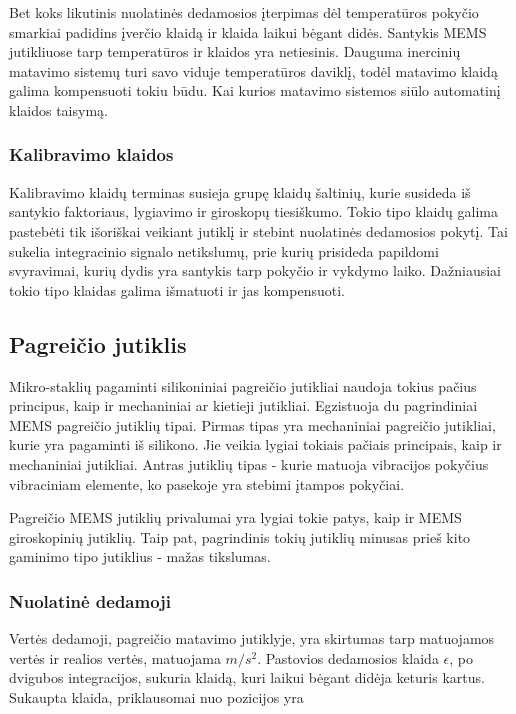 Bet koks likutinis nuolatinės dedamosios įterpimas dėl temperatūros pokyčio smarkiai padidins įverčio klaidą ir klaida laikui bėgant didės.
Santykis MEMS jutikliuose tarp temperatūros ir klaidos yra netiesinis.
Dauguma inercinių matavimo sistemų turi savo viduje temperatūros daviklį, todėl matavimo klaidą galima kompensuoti tokiu būdu. 
Kai kurios matavimo sistemos siūlo automatinį klaidos taisymą.

\subsubsection{Kalibravimo klaidos}

Kalibravimo klaidų terminas susieja grupę klaidų šaltinių, kurie susideda iš santykio faktoriaus, lygiavimo ir giroskopų tiesiškumo. 
Tokio tipo klaidų galima pastebėti tik išoriškai veikiant jutiklį ir stebint nuolatinės dedamosios pokytį. 
Tai sukelia integracinio signalo netikslumų, prie kurių prisideda papildomi svyravimai, kurių dydis yra santykis tarp pokyčio ir vykdymo laiko. 
Dažniausiai tokio tipo klaidas galima išmatuoti ir jas kompensuoti.


\subsection{Pagreičio jutiklis}

Mikro-staklių pagaminti silikoniniai pagreičio jutikliai naudoja tokius pačius principus, kaip ir mechaniniai ar kietieji jutikliai. 
Egzistuoja du pagrindiniai MEMS pagreičio jutiklių tipai. 
Pirmas tipas yra mechaniniai pagreičio jutikliai, kurie yra pagaminti iš silikono. 
Jie veikia lygiai tokiais pačiais principais, kaip ir mechaniniai jutikliai. 
Antras jutiklių tipas - kurie matuoja vibracijos pokyčius vibraciniam elemente, ko pasekoje yra stebimi įtampos pokyčiai.

Pagreičio MEMS jutiklių privalumai yra lygiai tokie patys, kaip ir MEMS giroskopinių jutiklių. 
Taip pat, pagrindinis tokių jutiklių minusas prieš kito gaminimo tipo jutiklius - mažas tikslumas. 

\subsubsection{Nuolatinė dedamoji}

Vertės dedamoji, pagreičio matavimo jutiklyje, yra skirtumas tarp matuojamos vertės ir realios vertės, matuojama $m/s^2$.
Pastovios dedamosios klaida $\epsilon$, po dvigubos integracijos, sukuria klaidą, kuri laikui bėgant didėja keturis kartus. 
Sukaupta klaida, priklausomai nuo pozicijos yra

